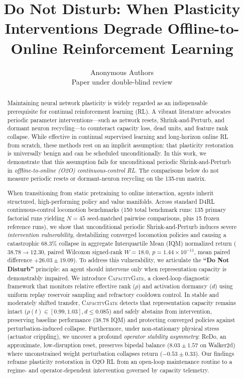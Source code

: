 \documentclass{article}
\title{Do Not Disturb: When Plasticity Interventions Degrade Offline-to-Online Reinforcement Learning}
\author{Anonymous Authors \\
Paper under double-blind review
}
\begin{document}
\maketitle

\begin{abstract}
Maintaining neural network plasticity is widely regarded as an indispensable prerequisite for continual reinforcement learning (RL). A vibrant literature advocates periodic parameter interventions---such as network resets, Shrink-and-Perturb, and dormant neuron recycling---to counteract capacity loss, dead units, and feature rank collapse. While effective in continual supervised learning and long-horizon online RL from scratch, these methods rest on an implicit assumption: that plasticity restoration is universally benign and can be scheduled unconditionally. In this work, we demonstrate that this assumption fails for unconditional periodic Shrink-and-Perturb in \emph{offline-to-online (O2O) continuous-control RL}. The comparisons below do not measure periodic resets or dormant-neuron recycling on the 135-run matrix. 

When transitioning from static pretraining to online interaction, agents inherit structured, high-performing policy and value manifolds. Across standard D4RL continuous-control locomotion benchmarks (150 total benchmark runs: 135 primary factorial runs yielding $N=45$ seed-matched pairwise comparisons, plus 15 frozen reference runs), we show that unconditional periodic Shrink-and-Perturb induces severe \emph{intervention vulnerability}, destabilizing converged locomotion policies and causing a catastrophic 68.3\% collapse in aggregate Interquartile Mean (IQM) normalized return ($38.78 \to 12.30$, paired Wilcoxon signed-rank $W = 18.0$, $p = 1.44 \times 10^{-11}$, mean paired difference $+26.03 \pm 19.09$). To address this vulnerability, we articulate the \textbf{``Do Not Disturb''} principle: an agent should intervene only when representation capacity is demonstrably impaired. We introduce \textsc{CapacityGate}, a closed-loop diagnostic framework that monitors relative effective rank ($\rho$) and activation dormancy ($d$) using uniform replay reservoir sampling and refractory cooldown control. In stable and moderately shifted transfer, \textsc{CapacityGate} detects that representation capacity remains intact ($\rho(t) \in [0.99, 1.03], d \le 0.085$) and safely abstains from intervention, preserving baseline performance ($38.78$ IQM) and protecting converged policies against perturbation-induced collapse. Furthermore, under non-stationary physical stress (actuator crippling), we uncover a profound \emph{operator stability asymmetry}: ReDo, an approximate, low-disruption reset, preserves bipedal balance ($8.03 \pm 1.57$ on Walker2d) where unconstrained weight perturbation collapses return ($-0.53 \pm 0.33$). Our findings reframe plasticity restoration in O2O RL from an open-loop maintenance routine to a regime- and operator-dependent intervention governed by capacity telemetry.
\end{abstract}
\end{document}
